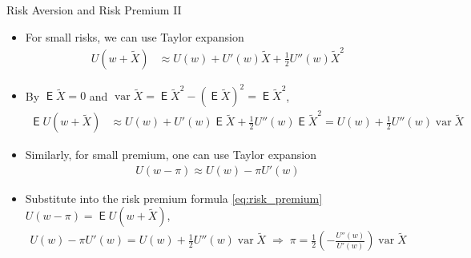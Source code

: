 \documentclass[10pt,handout]{beamer}
\DeclareMathOperator\expc{\mathsf{E}}
\DeclareMathOperator\var{var}
\newcommand{\ie}{\;\Longrightarrow\;}
\begin{document}
\begin{frame}{Risk Aversion and Risk Premium II}
  \begin{itemize}[<+->]
    \item For small risks, we can use Taylor expansion 
      \begin{align*}
        U(w + \widetilde{X}) &\approx U(w) + U'(w)\widetilde{X} + \frac{1}{2}U''(w)\widetilde{X}^2
      \end{align*}
    \item By $\expc{\widetilde{X}} = 0$ and $\var{\widetilde{X}} = \expc{\widetilde{X}^2} - (\expc{\widetilde{X}})^2 = \expc{\widetilde{X}^2}$, 
      \begin{align*}
        \expc{U(w + \widetilde{X})} &\approx U(w) + U'(w)\expc{\widetilde{X}} + \frac{1}{2}U''(w)\expc{\widetilde{X}^2} = U(w) + \frac{1}{2}U''(w)\var{\widetilde{X}}
      \end{align*}
    \item Similarly, for small premium, one can use Taylor expansion 
      \begin{align*}
        U(w - \pi) \approx U(w) - \pi U'(w)
      \end{align*}
    \item Substitute into the risk premium formula \eqref{eq:risk_premium} $U(w - \pi) = \expc{U(w + \widetilde{X})}$,
      \begin{align*}
        U(w) - \pi U'(w) = U(w) + \frac{1}{2}U''(w)\var{\widetilde{X}} \ie \pi = \frac{1}{2}\left(-\frac{U''(w)}{U'(w)}\right)\var{\widetilde{X}}
      \end{align*}
  \end{itemize}
\end{frame}
\end{document}
